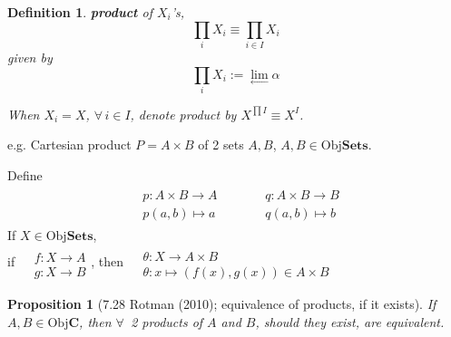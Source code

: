 \documentclass[10pt]{amsart}
\newtheorem{proposition}{Proposition}
\newtheorem{definition}{Definition}
\begin{document}
\begin{multicols*}{2}
\begin{definition}
	\textbf{product} of $X_i$'s, 
	\[ 
	\prod_i X_i \equiv \prod_{i\in I} X_i
	\]
	given by 
	\begin{equation}
	\prod_i X_i := \lim_{ \longleftarrow } \alpha 
	\end{equation}
	
	When $X_i = X$, $\forall \, i \in I$, denote product by $X^{ \prod I} \equiv X^I$.  
	
	
\end{definition}

e.g. Cartesian product $P= A\times B$ of 2 sets $A,B$, $A,B \in \text{Obj}\textbf{Sets}$.  

Define 	
\[
\begin{gathered}
\begin{aligned}
& p:A\times B \to A \\
& p(a,b) \mapsto a 
\end{aligned} \qquad \, 
\begin{aligned}
& q:A\times B \to B \\
& q(a,b) \mapsto b 
\end{aligned}
\end{gathered}
\]
If $X \in \text{Obj}\textbf{Sets}$,  \\
if 
$	\begin{aligned} & \quad \\ 
& f: X \to A \\
& g : X  \to B 
\end{aligned}
$, then $\begin{aligned} & \quad \\ 
& \theta: X \to A\times B \\
& \theta : x \mapsto (f(x),g(x)) \in A\times B
\end{aligned}
$

\begin{proposition}[7.28 Rotman (2010); equivalence of products, if it exists]
	If $A,B \in \text{Obj}\mathbf{C}$, then $\forall \, $ 2 products of $A$ and $B$, should they exist, are equivalent. 
\end{proposition}


\end{multicols*}
\end{document}

